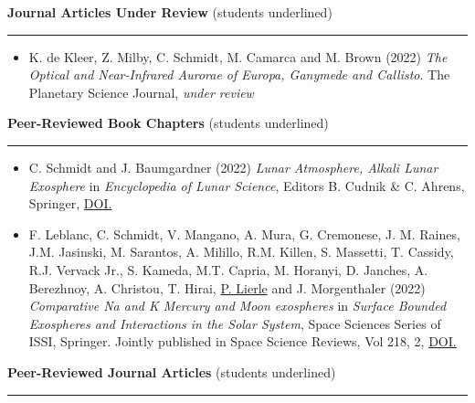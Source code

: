 \documentclass[12pt]{report}
\begin{document}
\vspace{2 mm}
\noindent\textbf{Journal Articles Under Review} (students underlined) \rm\hspace*{\fill} \\
\rule{\textwidth}{1pt}
\begin{itemize} \itemsep -2pt %
  \item K. de Kleer, Z. Milby, C. Schmidt, M. Camarca and M. Brown (2022) \textit{The Optical and Near-Infrared Aurorae of Europa, Ganymede and Callisto}. The Planetary Science Journal, \textit{under review}
 \end{itemize}
\vspace{2 mm}
\noindent\textbf{Peer-Reviewed Book Chapters} (students underlined) \rm\hspace*{\fill} \\
\rule{\textwidth}{1pt}
\begin{itemize} \itemsep -2pt %
  \item C. Schmidt and J. Baumgardner (2022) \textit{Lunar Atmosphere, Alkali Lunar Exosphere} in \textit{Encyclopedia of Lunar Science}, Editors B. Cudnik \& C. Ahrens, Springer, \href{https://doi.org/10.1007/978-3-319-05546-6_230-1}{DOI.}
  \item F. Leblanc, C. Schmidt, V. Mangano, A. Mura, G. Cremonese, J. M. Raines, J.M. Jasinski, M. Sarantos, A. Milillo, R.M. Killen, S. Massetti, T. Cassidy, R.J. Vervack Jr., S. Kameda, M.T. Capria, M. Horanyi, D. Janches, A. Berezhnoy, A. Christou, T. Hirai, \underline{P. Lierle} and J. Morgenthaler (2022) \textit{Comparative Na and K Mercury and Moon exospheres} in \textit{Surface Bounded Exospheres and Interactions in the Solar System}, Space Sciences Series of ISSI, Springer. Jointly published in Space Science Reviews, Vol 218, 2, \href{ https://doi.org/10.1007/s11214-022-00871-w}{DOI.}
 \end{itemize}
\vspace{2 mm}
\noindent\textbf{Peer-Reviewed Journal Articles} (students underlined) \rm\hspace*{\fill} \\
\rule{\textwidth}{1pt}
\end{document}
